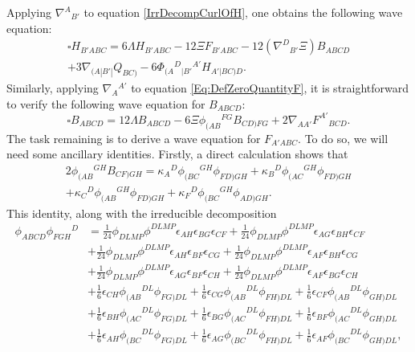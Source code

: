 \documentclass[10pt,a4paper]{article}
\theoremstyle{plain}
\begin{document}
Applying $\nabla^A{}_{B'}$ to equation \eqref{IrrDecompCurlOfH}, one
obtains the following wave equation:
\begin{multline}
    \square H_{B'ABC} = 6 \Lambda H_{B'ABC} - 12 \Xi F_{B'ABC} -
    12(\nabla^{D}{}_{B'}\Xi) B_{ABCD} \\+ 3\nabla_{(A|B'|}Q_{BC)} - 6
    \Phi_{(A}{}^{D}{}_{|B'}{}^{A'}H_{A'|BC)D}. \label{Eq:WaveEqForH}
\end{multline}
Similarly, applying $\nabla_A{}^{A'}$ to equation
\eqref{Eq:DefZeroQuantityF}, it is straightforward to verify the
following wave equation for $B_{ABCD}$:
\begin{equation}
     \square B_{ABCD} = 12\Lambda B_{ABCD} - 6\Xi
     \phi_{(AB}{}^{FG}B_{CD)FG} +
     2\nabla_{AA'}F^{A'}{}_{BCD}. \label{Eq:FirstWaveEqForB}
\end{equation}
The task remaining is to derive a wave equation for $F_{A'ABC}$.  To
do so, we will need some ancillary identities. Firstly, a direct
calculation shows that
\begin{multline}
2\phi_{(AB}{}^{GH}B_{CF)GH}=
\kappa_A{}^D\phi_{(BC}{}^{GH}\phi_{FD)GH}+\kappa_B{}^D\phi_{(AC}{}^{GH}\phi_{FD)GH}
\\+\kappa_C{}^D\phi_{(AB}{}^{GH}\phi_{FD)GH}+\kappa_F{}^D\phi_{(BC}{}^{GH}\phi_{AD)GH}.
\label{Eq:UsefulIdentity1}
 \end{multline}
This identity, along with the irreducible decomposition
\begin{align*}
\phi_{ABCD} \phi_{FGH}{}^{D} &= \tfrac{1}{24} \phi_{DLMP} \phi^{DLMP}
\epsilon_{AH} \epsilon_{BG} \epsilon_{CF} + \tfrac{1}{24} \phi_{DLMP}
\phi^{DLMP} \epsilon_{AG} \epsilon_{BH} \epsilon_{CF} \\ & +
\tfrac{1}{24} \phi_{DLMP} \phi^{DLMP} \epsilon_{AH} \epsilon_{BF}
\epsilon_{CG} + \tfrac{1}{24} \phi_{DLMP} \phi^{DLMP} \epsilon_{AF}
\epsilon_{BH} \epsilon_{CG} \\ &+ \tfrac{1}{24} \phi_{DLMP}
\phi^{DLMP} \epsilon_{AG} \epsilon_{BF} \epsilon_{CH} + \tfrac{1}{24}
\phi_{DLMP} \phi^{DLMP} \epsilon_{AF} \epsilon_{BG} \epsilon_{CH}
\\ &+ \tfrac{1}{6} \epsilon_{CH} \phi_{(AB}{}^{DL}\phi_{FG)DL} +
\tfrac{1}{6} \epsilon_{CG} \phi_{(AB}{}^{DL}\phi_{FH)DL} +
\tfrac{1}{6} \epsilon_{CF} \phi_{(AB}{}^{DL}\phi_{GH)DL}\\ & +
\tfrac{1}{6} \epsilon_{BH} \phi_{(AC}{}^{DL}\phi_{FG)DL} +
\tfrac{1}{6} \epsilon_{BG} \phi_{(AC}{}^{DL}\phi_{FH)DL} +
\tfrac{1}{6} \epsilon_{BF} \phi_{(AC}{}^{DL}\phi_{GH)DL}\\ &+
\tfrac{1}{6} \epsilon_{AH} \phi_{(BC}{}^{DL}\phi_{FG)DL} +
\tfrac{1}{6} \epsilon_{AG} \phi_{(BC}{}^{DL}\phi_{FH)DL} +
\tfrac{1}{6} \epsilon_{AF} \phi_{(BC}{}^{DL}\phi_{GH)DL},
\end{align*}
\end{document}
